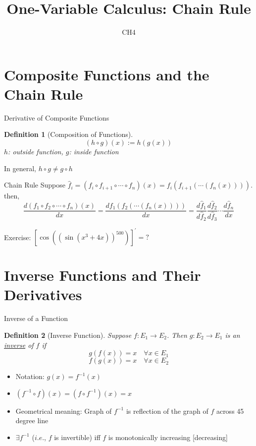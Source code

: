 \documentclass[final]{beamer}
\author[조남운]{\mail}
\title{One-Variable Calculus: Chain Rule}
\subtitle{CH4}
\newtheorem{defn}{Definition}
\begin{document}
	\maketitle


\section{Composite Functions and the Chain Rule} %
\label{sec:composite_functions_and_the_chain_rule}

\begin{frame}[t]{Derivative of Composite Functions}
	\begin{defn}
		[Composition of Functions]
		\[
			( h\circ g )(x) := h(g(x))
		\]
		$h$: outside function, $g$: inside function
	\end{defn}
	In general, $h\circ g \neq g \circ h$
	\begin{block}
		{Chain Rule}
		Suppose $\hat f_i = (f_i \circ f_{i+1} \circ \cdots \circ f_n)(x)=f_i(f_{i+1}(\cdots(f_n(x))))$. then,
		\[
			\frac{d( f_1 \circ f_2 \circ \cdots \circ f_n)(x)}{dx}=\frac{df_1(f_2(\cdots(f_n(x))))}{dx}= \frac{d\hat f_1}{d\hat f_2}\frac{d\hat f_2}{d\hat f_3}\cdots\frac{d\hat f_n}{dx}
		\]
	\end{block}
		Exercise: $[\cos((\sin(x^3+4x))^{500})]^\prime =?$
\end{frame}



\section{Inverse Functions and Their Derivatives} %
\label{sec:inverse_functions_and_their_derivatives}

\begin{frame}[t]{Inverse of a Function}
	\begin{defn}
		[Inverse Function]
		Suppose $f:E_1 \rightarrow E_2$. Then $g:E_2\rightarrow E_1$ is an \uline{inverse} of $f$ if\[
			g(f(x))=x\quad \forall x\in E_1
		\]\[
						f(g(x))=x\quad \forall x\in E_2
		\]
	\end{defn}
	\begin{itemize}
		\item Notation: $g(x)=f^{-1}(x)$
		\item $(f^{-1}\circ f) (x) = (f\circ f^{-1}) (x)=x$
		\item Geometrical meaning: Graph of $f^{-1}$ is reflection of the graph of $f$ across 45 degree line
		\item $\exists f^{-1}$ ($i.e.$, $f$ is invertible) iff $f$ is monotonically increasing [decreasing]
	\end{itemize}
\end{frame}
\end{document}
